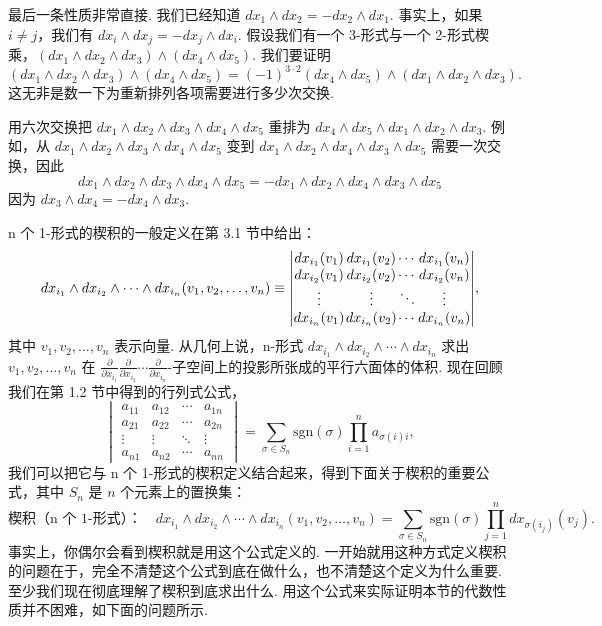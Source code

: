 最后一条性质非常直接. 我们已经知道 $dx_1\wedge dx_2=-dx_2\wedge dx_1$. 事实上，如果 $i\neq j$，我们有 $dx_i\wedge dx_j=-dx_j\wedge dx_i$. 假设我们有一个 3-形式与一个 2-形式楔乘，$(dx_1\wedge dx_2\wedge dx_3)\wedge(dx_4\wedge dx_5)$. 我们要证明
\[
(dx_1\wedge dx_2\wedge dx_3)\wedge(dx_4\wedge dx_5)=(-1)^{3\cdot2}(dx_4\wedge dx_5)\wedge(dx_1\wedge dx_2\wedge dx_3).
\]
这无非是数一下为重新排列各项需要进行多少次交换.

\begin{question}\label{q:3-10}
用六次交换把 $dx_1\wedge dx_2\wedge dx_3\wedge dx_4\wedge dx_5$ 重排为 $dx_4\wedge dx_5\wedge dx_1\wedge dx_2\wedge dx_3$. 例如，从 $dx_1\wedge dx_2\wedge dx_3\wedge dx_4\wedge dx_5$ 变到 $dx_1\wedge dx_2\wedge dx_4\wedge dx_3\wedge dx_5$ 需要一次交换，因此
\[
dx_1\wedge dx_2\wedge dx_3\wedge dx_4\wedge dx_5=-dx_1\wedge dx_2\wedge dx_4\wedge dx_3\wedge dx_5
\]
因为 $dx_3\wedge dx_4=-dx_4\wedge dx_3$.
\end{question}

n 个 1-形式的楔积的一般定义在第 3.1 节中给出：
\[
dx_{i_1}\wedge dx_{i_2}\wedge\cdots\wedge dx_{i_n}(v_1,v_2,\ldots,v_n)\equiv
{\setlength{\arraycolsep}{0.5pt}\begin{vmatrix}
dx_{i_1}(v_1) & dx_{i_1}(v_2) & \cdots & dx_{i_1}(v_n)\\
dx_{i_2}(v_1) & dx_{i_2}(v_2) & \cdots & dx_{i_2}(v_n)\\
\vdots & \vdots & \ddots & \vdots\\
dx_{i_n}(v_1) & dx_{i_n}(v_2) & \cdots & dx_{i_n}(v_n)
\end{vmatrix}},
\]
其中 $v_1,v_2,\ldots,v_n$ 表示向量. 从几何上说，n-形式 $dx_{i_1}\wedge dx_{i_2}\wedge\cdots\wedge dx_{i_n}$ 求出 $v_1,v_2,\ldots,v_n$ 在 $\frac{\partial}{\partial x_{i_1}}\frac{\partial}{\partial x_{i_2}}\cdots\frac{\partial}{\partial x_{i_n}}$-子空间上的投影所张成的平行六面体的体积. 现在回顾我们在第 1.2 节中得到的行列式公式，
\[
\begin{vmatrix}
a_{11} & a_{12} & \cdots & a_{1n}\\
a_{21} & a_{22} & \cdots & a_{2n}\\
\vdots & \vdots & \ddots & \vdots\\
a_{n1} & a_{n2} & \cdots & a_{nn}
\end{vmatrix}
=\sum_{\sigma\in S_n}\mathrm{sgn}(\sigma)\prod_{i=1}^{n}a_{\sigma(i)i},
\]
我们可以把它与 n 个 1-形式的楔积定义结合起来，得到下面关于楔积的重要公式，其中 $S_n$ 是 $n$ 个元素上的置换集：
\[
\text{楔积（n 个 1-形式）：}\quad
dx_{i_1}\wedge dx_{i_2}\wedge\cdots\wedge dx_{i_n}(v_1,v_2,\ldots,v_n)
=\sum_{\sigma\in S_n}\mathrm{sgn}(\sigma)\prod_{j=1}^{n}dx_{\sigma(i_j)}(v_j).
\]
事实上，你偶尔会看到楔积就是用这个公式定义的. 一开始就用这种方式定义楔积的问题在于，完全不清楚这个公式到底在做什么，也不清楚这个定义为什么重要. 至少我们现在彻底理解了楔积到底求出什么. 用这个公式来实际证明本节的代数性质并不困难，如下面的问题所示.

